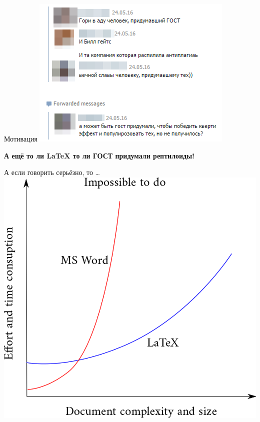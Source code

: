 \documentclass[newPxFont]{beamer}
\begin{document}
\begin{frame}{Мотивация}
    \centering
    \includegraphics[scale=0.5]{m10.png}
    
    \vfill
    \alert{\textbf{А ещё то ли \LaTeX{} то ли ГОСТ придумали рептилоиды!}}
\end{frame}


\begin{frame}{А если говорить серьёзно, то \ldots} 
    \centering
    \includegraphics[scale=0.2]{latexvsword.png}
\end{frame}
\end{document}
